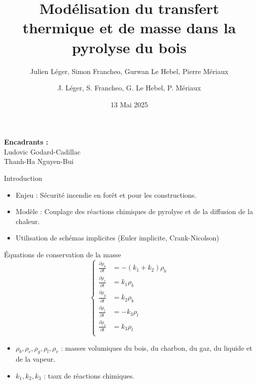 \documentclass{beamer}
\title{Modélisation du transfert thermique et de masse dans la pyrolyse du bois}
\author{Julien Léger, Simon Francheo, Gurwan Le Hebel, Pierre Mériaux}
\institute{ENSEIRB-Matmeca, Filière Mathématiques et Mécanique 1ère année}
\date{13 Mai 2025}
\begin{document}
\begin{frame}[plain]
    \titlepage

    \vfill
    \centering
        \parbox{0.4\textwidth}{
            \centering \footnotesize \textbf{Encadrants :}\\
            Ludovic Godard-Cadillac\\
            Thanh-Ha Nguyen-Bui
        }
\end{frame}

\author{J. Léger, S. Francheo, G. Le Hebel, P. Mériaux}
\begin{frame}{Introduction}
    \begin{itemize}
        \item Enjeu : Sécurité incendie en forêt et pour les constructions.
        \item Modèle : Couplage des réactions chimiques de pyrolyse et de la diffusion de la chaleur.
        \item Utilisation de schémas implicites (Euler implicite, Crank-Nicolson)
    \end{itemize}
\end{frame}

\begin{frame}{Équations de conservation de la masse}
    \begin{equation}
        \left\lbrace
            \begin{aligned}
                \frac{\partial \rho_b}{\partial t} &= -(k_1 + k_2)\rho_b \\
                \frac{\partial \rho_c}{\partial t} &= k_1\rho_b\\
                \frac{\partial \rho_g}{\partial t} &= k_2\rho_b\\
                \frac{\partial \rho_l}{\partial t} &= -k_3\rho_l\\
                \frac{\partial \rho_v}{\partial t} &= k_3\rho_l\\
            \end{aligned}
        \right.
    \end{equation}
    \begin{itemize}
        \item $\rho_b, \rho_c, \rho_g, \rho_l, \rho_v$ : masses volumiques du bois, du charbon, du gaz, du liquide et de la vapeur.
        \item $k_1, k_2, k_3$ : taux de réactions chimiques.
    \end{itemize}
\end{frame}
\end{document}
